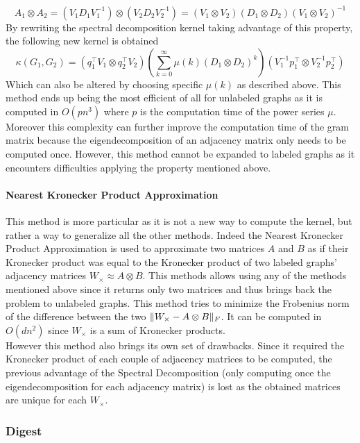 \documentclass{article}
\DeclarePairedDelimiter{\norm}{\lVert}{\rVert}
\theoremstyle{definition}
\begin{document}
\begin{equation}
	A_1 \otimes A_2=(V_{1}D_{1}V_{1}^{-1})\otimes(V_{2}D_{2}V_{2}^{-1})=(V_1\otimes V_2)(D_1 \otimes D_2)(V_1 \otimes V_2)^{-1}
\end{equation}
By rewriting the spectral decomposition kernel taking advantage of this property, the following new kernel is obtained
\begin{equation}
	\kappa(G_1,G_2)=(q_{1}^{\top}V_{1}\otimes q_{2}^{\top}V_{2})(\sum\limits_{k=0}^{\infty}\mu(k)(D_{1}\otimes D_{2})^k)(V_{1}^{-1}p_{1}^{\top}\otimes V_{2}^{-1}p_{2}^{\top})
\end{equation}
Which can also be altered by choosing specific $\mu(k)$ as described above. This method ends up being the most efficient of all for unlabeled graphs as it is computed in $O(pn^3)$ where $p$ is the computation time of the power series $\mu$. Moreover this complexity can further improve the computation time of the gram matrix because the eigendecomposition of an adjacency matrix only needs to be computed once. However, this method cannot be expanded to labeled graphs as it encounters difficulties applying the property mentioned above.
\paragraph{Nearest Kronecker Product Approximation}
This method is more particular as it is not a new way to compute the kernel, but rather a way to generalize all the other methods. Indeed the Nearest Kronecker Product Approximation\cite{van1993approximation} is used to approximate two matrices $A$ and $B$ as if their Kronecker product was equal to the Kronecker product of two labeled graphs' adjacency matrices $W_{\times} \approx A \otimes B$. This methods allows using any of the methods mentioned above since it returns only two matrices and thus brings back the problem to unlabeled graphs. This method tries to minimize the Frobenius norm of the difference between the two $\norm{W_\times - A\otimes B}_F$. It can be computed in $O(dn^2)$ since $W_\times$ is a sum of Kronecker products.\\
However this method also brings its own set of drawbacks. Since it required the Kronecker product of each couple of adjacency matrices to be computed, the previous advantage of the Spectral Decomposition (only computing once the eigendecomposition for each adjacency matrix) is lost as the obtained matrices are unique for each $W_\times$.

\subsubsection{Digest}
\end{document}
